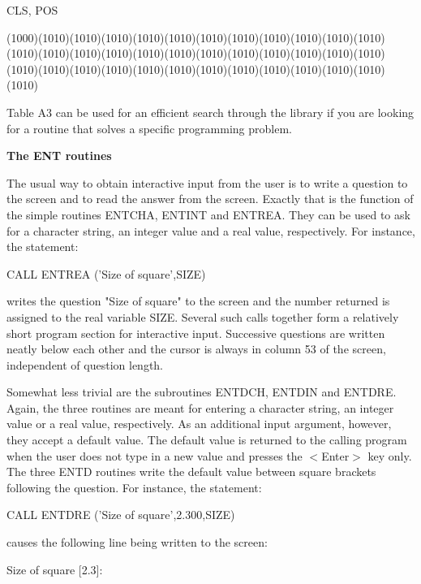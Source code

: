 \documentclass[11pt]{article}
\begin{document}
\begin{indenting}{6.35cm}
CLS, POS
\end{indenting}
\GrBox(1000)\GrBox(1010)\GrBox(1010)\GrBox(1010)\GrBox(1010)\GrBox(1010)\GrBox(1010)\GrBox(1010)\GrBox(1010)\GrBox(1010)\GrBox(1010)\GrBox(1010)\GrBox(1010)\GrBox(1010)\GrBox(1010)\GrBox(1010)\GrBox(1010)\GrBox(1010)\GrBox(1010)\GrBox(1010)\GrBox(1010)\GrBox(1010)\GrBox(1010)\GrBox(1010)\GrBox(1010)\GrBox(1010)\GrBox(1010)\GrBox(1010)\GrBox(1010)\GrBox(1010)\GrBox(1010)\GrBox(1010)\GrBox(1010)\GrBox(1010)\GrBox(1010)\GrBox(1010)\GrBox(1010)\-

Table A3 can be used for an efficient search through the library if you are looking for a
routine that solves a specific programming problem. 

\bigskip
\bigskip
{\bf The ENT routines}

The usual way to obtain interactive input from the user is to write a question to the screen
and to read the answer from the screen. Exactly that is the function of the simple routines
ENTCHA, ENTINT and ENTREA. They can be used to ask for a character string, an
integer value and a real value, respectively. For instance, the statement:

\hspace*{1.28cm}CALL ENTREA ('Size of square',SIZE)

writes the question "Size of square" to the screen and the number returned is assigned to
the real variable SIZE. Several such calls together form a relatively short program section
for interactive input. Successive questions are written neatly below each other and the
cursor is always in column 53 of the screen, independent of question length.

Somewhat less trivial are the subroutines ENTDCH, ENTDIN and ENTDRE. Again, the
three routines are meant for entering a character string, an integer value or a real value,
respectively. As an additional input argument, however, they accept a default value. The
default value is returned to the calling program when the user does not type in a new
value and presses the $<$Enter$>$ key only. The three ENTD routines write the default
value between square brackets following the question. For instance, the statement:

\hspace*{1.28cm}CALL ENTDRE ('Size of square',2.300,SIZE)

\bigskip
\bigskip
causes the following line being written to  the screen:

\hspace*{1.28cm}Size of square [2.3]:
\end{document}
